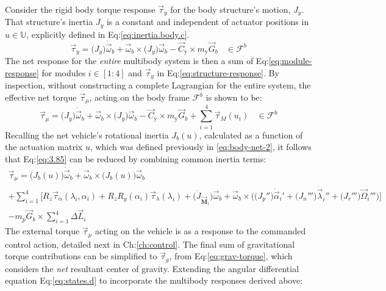 Consider the rigid body torque response $\vec{\tau}_y$ for the body structure's motion, $J_y$. That structure's inertia $J_y$ is a constant and independent of actuator positions in $u\in\mathbb{U}$, explicitly defined in Eq:\ref{eq:inertia.body.c}.
\begin{equation}\label{eq:structure-response}
\vec{\tau}_y=\big(J_y\big)\dot{\vec{\omega}}_b+\vec{\omega}_b\times\big(J_y\big)\vec{\omega}_b-\vec{C}_\text{y}\times m_\text{y}\vec{G}_b~~~~\in\mathcal{F}^b
\end{equation}
The net response for the \emph{entire} multibody system is then a sum of Eq:\ref{eq:module-response} for modules $i\in[1:4]$ and $\vec{\tau}_y$ in Eq:\ref{eq:structure-response}. By inspection, without constructing a complete Lagrangian for the entire system, the effective net torque $\vec{\tau}_{\mu}$, acting on the body frame $\mathcal{F}^b$ is shown to be:
\begin{equation}\label{eq:3.85}
\vec{\tau}_\mu = \big(J_y\big)\dot{\vec{\omega}}_b+\vec{\omega}_b\times\big(J_y\big)\vec{\omega}_b-\vec{C}_\text{y}\times m_\text{y}\vec{G}_b+\sum_{i=1}^{4}\vec{\tau}_{M}(u_i)~~~~\in\mathcal{F}^b
\end{equation}
Recalling the net vehicle's rotational inertia $J_b(u)$, calculated as a function of the actuation matrix $u$, which was defined previously in \ref{eq:body-net-2}, it follows that Eq:\ref{eq:3.85} can be reduced by combining common inertia terms:
\begin{multline}\label{eq:3.109}
\vec{\tau}_\mu=\big(J_b(u)\big)\dot{\vec{\omega}}_b+\vec{\omega}_b\times\big(J_b(u)\big)\vec{\omega}_b
\\
+\sum_{i=1}^{4}\Big[R_z\vec{\tau}_\alpha(\lambda_i,\alpha_i)+R_zR_y(\alpha_i)\vec{\tau}_\lambda(\lambda_i)+\big(\dot{J}_{\vec{\mathbf{M}}_i}\big)\vec{\omega}_b+\vec{\omega}_b\times\Big(\big(J_p''\big)\dot{\vec{\alpha}}_i'+\big(J_n'''\big)\dot{\vec{\lambda}}_i''+\big(J_r'''\big)\vec{\Omega}_i'''\Big)\Big]
\\
-m_p\vec{G}_b\times\sum_{i=1}^{4}\Delta \vec{L}_i
\end{multline}
The external torque $\vec{\tau}_{\mu}$ acting on the vehicle is as a response to the commanded control action, detailed next in Ch:\ref{ch:control}. The final sum of gravitational torque contributions can be simplified to $\vec{\tau}_g$, from Eq:\ref{eq:grav-torque}, which considers the \emph{net} resultant center of gravity. Extending the angular differential equation Eq:\ref{eq:states.d} to incorporate the multibody responses derived above:
